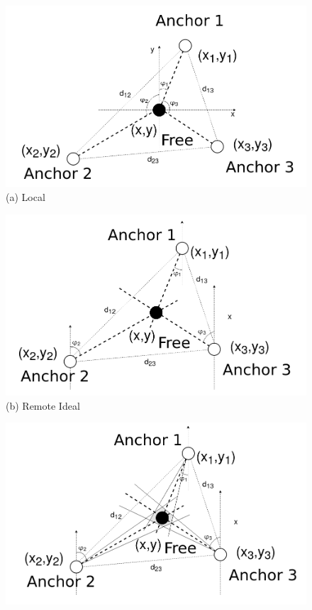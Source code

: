\begin{figure} [H]
	\centering
	\hspace*{+2cm}\begin{minipage}{0.4\textwidth}
		\centering
		\includegraphics[width=\linewidth]{../Photos/Tringulation-local.png}
		{(a) Local}
	\end{minipage}
	\newline
	\hspace*{+1cm}\begin{minipage}{.4\textwidth}
		\centering
		\includegraphics[width=\linewidth]{../Photos/Tringulation-remote.png}
		{(b) Remote Ideal}
	\end{minipage}%
	\begin{minipage}{.4\textwidth}
		\centering
		\includegraphics[width=\linewidth]{../Photos/Tringulation-remote-actual.png}

\end{minipage}
\end{figure}
